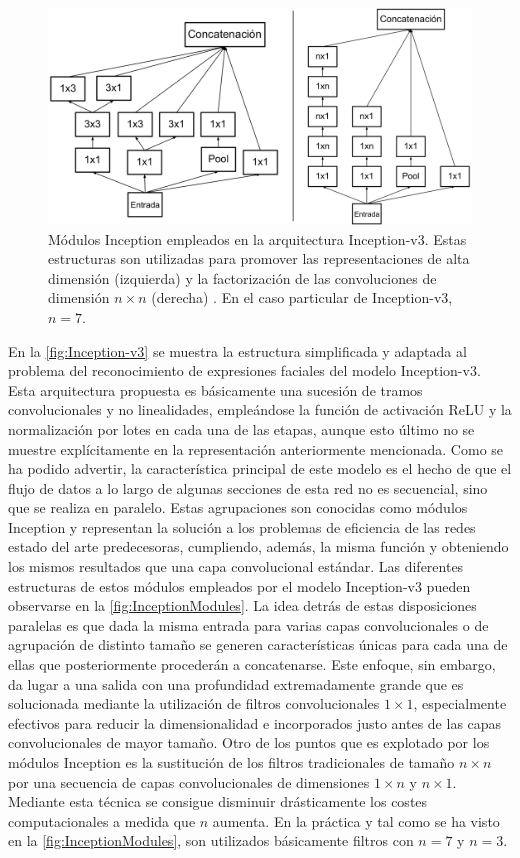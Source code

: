 \begin{figure}
    \centering
    \includegraphics[width=\textwidth]{Images/InceptionModules.png}
    \caption{Módulos Inception empleados en la arquitectura Inception-v3. Estas estructuras son utilizadas para promover las representaciones de alta dimensión (izquierda) y la factorización de las convoluciones de dimensión $n\times n$ (derecha) \cite{Inception-v3}. En el caso particular de Inception-v3, $n=7$.}
    \label{fig:InceptionModules}
\end{figure}

En la \autoref{fig:Inception-v3} se muestra la estructura simplificada y adaptada al problema del reconocimiento de expresiones faciales del modelo Inception-v3. Esta arquitectura propuesta es básicamente una sucesión de tramos convolucionales y no linealidades, empleándose la función de activación ReLU y la normalización por lotes en cada una de las etapas, aunque esto último no se muestre explícitamente en la representación anteriormente mencionada. Como se ha podido advertir, la característica principal de este modelo es el hecho de que el flujo de datos a lo largo de algunas secciones de esta red no es secuencial, sino que se realiza en paralelo. Estas agrupaciones son conocidas como módulos Inception y representan la solución a los problemas de eficiencia de las redes estado del arte predecesoras, cumpliendo, además, la misma función y obteniendo los mismos resultados que una capa convolucional estándar. Las diferentes estructuras de estos módulos empleados por el modelo Inception-v3 pueden observarse en la \autoref{fig:InceptionModules}. La idea detrás de estas disposiciones paralelas es que dada la misma entrada para varias capas convolucionales o de agrupación de distinto tamaño se generen características únicas para cada una de ellas que posteriormente procederán a concatenarse. Este enfoque, sin embargo, da lugar a una salida con una profundidad extremadamente grande que es solucionada mediante la utilización de filtros convolucionales $1\times 1$, especialmente efectivos para reducir la dimensionalidad \cite{NetworkInNetwork} e incorporados justo antes de las capas convolucionales de mayor tamaño. Otro de los puntos que es explotado por los módulos Inception es la sustitución de los filtros tradicionales de tamaño $n\times n$ por una secuencia de capas convolucionales de dimensiones $1\times n$ y $n \times 1$. Mediante esta técnica se consigue disminuir drásticamente los costes computacionales a medida que $n$ aumenta. En la práctica y tal como se ha visto en la \autoref{fig:InceptionModules}, son utilizados básicamente filtros con $n = 7$ y $n = 3$.

